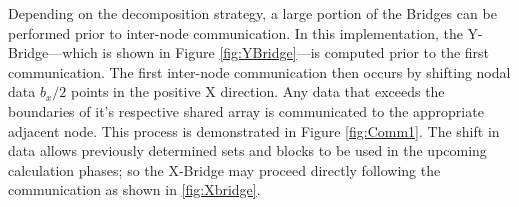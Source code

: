 \documentclass[review]{elsarticle}
\begin{document}
\par
Depending on the decomposition strategy, a large portion of the Bridges can be performed prior to inter-node communication. In this implementation, the Y-Bridge---which is shown in Figure \ref{fig:YBridge}---is computed prior to the first communication. The first inter-node communication then occurs by shifting nodal data $b_x/2$ points in the positive X direction. Any data that exceeds the boundaries of it's respective shared array is communicated to the appropriate adjacent node. This process is demonstrated in Figure \ref{fig:Comm1}. The shift in data allows previously determined sets and blocks to be used in the upcoming calculation phases; so the X-Bridge may proceed directly following the communication as shown in \ref{fig:Xbridge}.

\begin{figure}[!htb]
    \centering
    

\end{figure}
\end{document}
